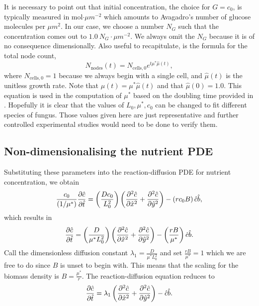 It is necessary to point out that initial concentration, the choice for $G = c_0$, is 
typically measured in mol$\cdot \mu m^{-2}$ which amounts to Avagadro's number of 
glucose molecules per $\mu m^{2}$. In our case, we choose a number $N_G$ such that 
the concentration comes out to $1.0 \ N_G \cdot \mu m^{-2}$. We always
omit the $N_G$ because it is of no consequence dimensionally.
Also useful to recapitulate, is the formula for the total node count,
\begin{equation}  
    N_{\textrm{nodes}}(t) = N_{\textrm{cells},0} e^{ t \mu^* \hat{\mu}(t)},
\end{equation}
where $N_{\textrm{cells},0} = 1$ because we always begin with a single cell,
and $\hat{\mu}(t)$ is the unitless growth rate. Note that
$\mu(t) = \mu^* \hat{\mu}(t)$ and that $\hat{\mu}(0) = 1.0$.
This equation is used in the computation of $\mu^*$ based on the doubling time
provided in \cite{salari2017investigation}.
Hopefully it is clear that
the values of $L_0, \mu^*, c_0$
can be changed to fit different species of fungus. Those values given here
are just representative and further controlled experimental studies would 
need to be done to verify them.

\subsection{Non-dimensionalising the nutrient PDE}

Substituting these parameters into the reaction-diffusion PDE for nutrient concentration, we obtain 
\begin{equation*}
    \frac{c_0}{(1/\mu^*)}\pdv{\hat{c}}{\hat{t}} = \left(\frac{D c_0}{ L_0^2} \right)\left(\pdv[2]{\hat{c}}{\hat{x}} + \pdv[2]{\hat{c}}{\hat{y}} \right) -
      \left( r c_0 B\right)  \hat{c}\hat{b},
\end{equation*}
which results in 
\begin{equation*}
    \pdv{\hat{c}}{\hat{t}} = \left(\frac{D}{ \mu^* L_0^2} \right)\left(\pdv[2]{\hat{c}}{\hat{x}} + \pdv[2]{\hat{c}}{\hat{y}} \right) -
      \left( \frac{r  B}{\mu^*}\right)  \hat{c}\hat{b}.
\end{equation*}
Call the dimensionless diffusion constant $\lambda_1 = \frac{D}{ \mu^* L_0^2}$ and 
set $\frac{r  B}{\mu^*}=1$ which we are free to do since $B$ is unset to begin with. This means 
that the scaling for the biomass density is $B = \frac{\mu^*}{r}$. The reaction-diffusion equation 
reduces to 
\begin{equation*}
    \pdv{\hat{c}}{\hat{t}} = \lambda_1 \left(\pdv[2]{\hat{c}}{\hat{x}} + \pdv[2]{\hat{c}}{\hat{y}} \right) -
      \hat{c}\hat{b}.
\end{equation*}

